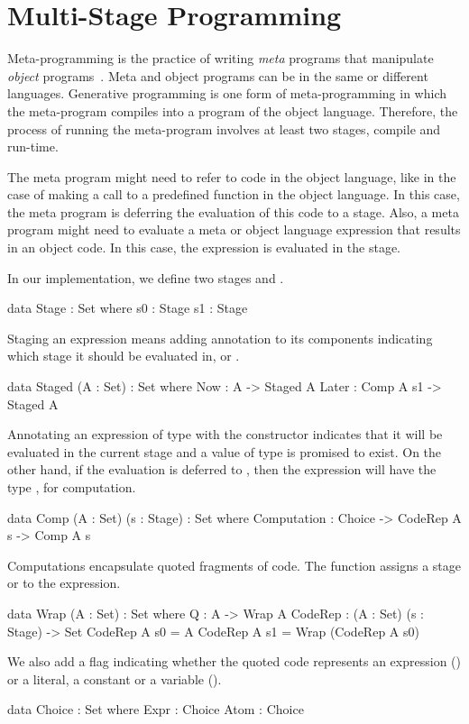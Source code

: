 \section{Multi-Stage Programming}
\label{sec:background:msp}
Meta-programming is the practice of writing \emph{meta} programs that manipulate \emph{object} programs~\cite{sheard2001Challenges, sheard2002TH,metaProg2019Survey}. Meta and object programs can be in the same or different languages. Generative programming is one form of meta-programming in which the meta-program compiles into a program of the object language. Therefore, the process of running the meta-program involves at least two stages, compile and run-time. 

The meta program might need to refer to code in the object language, like in the case of making a call to a predefined function in the object language. In this case, the meta program is deferring the evaluation of this code to a  stage. 
Also, a meta program might need to evaluate a meta or object language expression that results in an object code. In this case, the expression is evaluated in the  stage. 

In our implementation, we define two stages  and . 
\begin{togcode}
data Stage : Set where
  s0 : Stage
  s1 : Stage
\end{togcode} 

Staging an expression means adding annotation to its components indicating which stage it should be evaluated in, 
 or . 
\begin{togcode} 
data Staged (A : Set) : Set where
  Now : A -> Staged A
  Later : Comp A s1 -> Staged A
\end{togcode} 
Annotating an expression of type  with the  constructor indicates that it will be evaluated in the current stage and a value of type  is promised to exist. On the other hand, if the evaluation is deferred to , then the expression will have the type , for computation. 
\begin{togcode} 
data Comp (A : Set) (s : Stage) : Set where
  Computation : Choice -> CodeRep A s -> Comp A s
\end{togcode} 
Computations encapsulate quoted fragments of code. The  function assigns a stage  or  to the expression. 
\begin{togcode} 
data Wrap (A : Set) : Set where
  Q : A -> Wrap A
CodeRep : (A : Set) (s : Stage) -> Set
  CodeRep A s0 = A
  CodeRep A s1 = Wrap (CodeRep A s0)
\end{togcode} 
We also add a flag indicating whether the quoted code represents an expression () or a literal, a constant or a variable ().  
\begin{togcode} 
data Choice : Set where
  Expr : Choice
  Atom : Choice
\end{togcode} 

